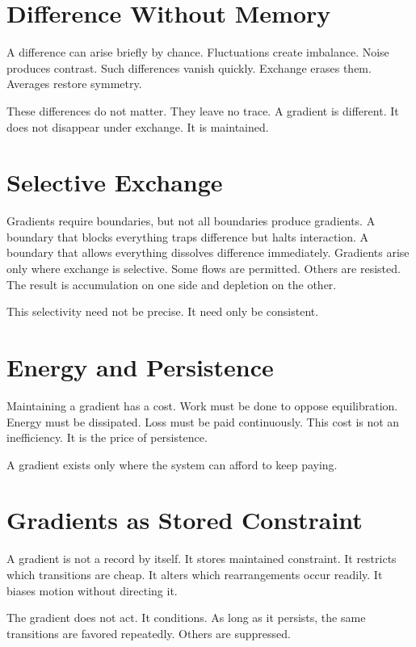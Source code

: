 \documentclass[11pt,twoside,openright]{book}
\begin{document}
\section*{Difference Without Memory}

A difference can arise briefly by chance. Fluctuations create imbalance. Noise produces contrast. Such differences vanish quickly. Exchange erases them. Averages restore symmetry.

These differences do not matter. They leave no trace. A gradient is different. It does not disappear under exchange. It is maintained.

\section*{Selective Exchange}

Gradients require boundaries, but not all boundaries produce gradients. A boundary that blocks everything traps difference but halts interaction. A boundary that allows everything dissolves difference immediately. Gradients arise only where exchange is selective. Some flows are permitted. Others are resisted. The result is accumulation on one side and depletion on the other.

This selectivity need not be precise. It need only be consistent.

\section*{Energy and Persistence}

Maintaining a gradient has a cost. Work must be done to oppose equilibration. Energy must be dissipated. Loss must be paid continuously. This cost is not an inefficiency. It is the price of persistence.

A gradient exists only where the system can afford to keep paying.

\section*{Gradients as Stored Constraint}

A gradient is not a record by itself. It stores maintained constraint. It restricts which transitions are cheap. It alters which rearrangements occur readily. It biases motion without directing it.

The gradient does not act. It conditions. As long as it persists, the same transitions are favored repeatedly. Others are suppressed.
\end{document}
